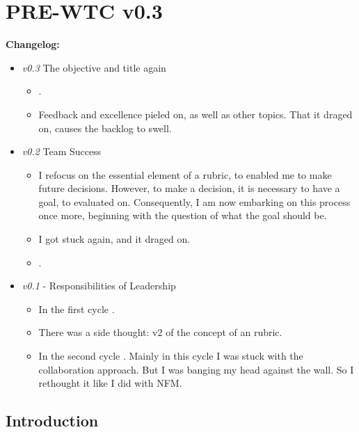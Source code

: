 \chapter{PRE-WTC v0.3}
\setcounter{section}{0}

\textbf{Changelog:}\\
\begin{itemize}
	\item \textit{v0.3} The objective and title again
	\begin{itemize}
		\item {}.
		\item Feedback and excellence pieled on, as well as other topics. That it draged on, causes the backlog to swell.
	\end{itemize}
	\item \textit{v0.2} Team Success
	\begin{itemize}
		\item I refocus on the essential element of a rubric, to enabled me to make future decisions. However, to make a decision, it is necessary to have a goal, to evaluated on. Consequently, I am now embarking on this process once more, beginning with the question of what the goal should be.
		\item I got stuck again, and it draged on.
		\item {}.
	\end{itemize}
	\item \textit{v0.1} - Responsibilities of Leadership
	\begin{itemize}
		\item In the first cycle 
		 	 .
		\item There was a side thought: v2 of the concept of an rubric.
		\item In the second cycle 
		 	 . Mainly in this cycle I was stuck with the collaboration approach. But I was banging my head against the wall. So I rethought it like I did with NFM.
	\end{itemize}
\end{itemize}

\pagebreak





\section{Introduction}

